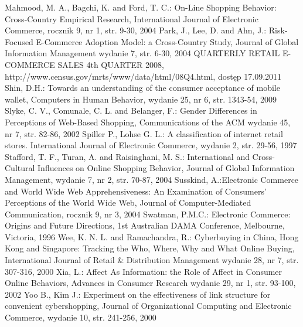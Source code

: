 {\begin{thebibliography}{5}
     Mahmood, M. A., Bagchi, K. and Ford, T. C.: On-Line Shopping Behavior: Cross-Country Empirical Research, International Journal of Electronic Commerce, rocznik 9, nr 1, str. 9-30, 2004
     Park, J., Lee, D. and Ahn, J.: Risk-Focused E-Commerce Adoption Model: a Cross-Country Study, Journal of Global Information Management wydanie 7, str. 6-30, 2004
     QUARTERLY RETAIL E-COMMERCE SALES 4th QUARTER 2008, http://www.census.gov/mrts/www/data/html/08Q4.html, dostęp 17.09.2011
     Shin, D.H.: Towards an understanding of the consumer acceptance of mobile wallet,
Computers in Human Behavior, wydanie 25, nr 6, str. 1343-54, 2009
     Slyke, C. V., Comunale, C. L. and Belanger, F.: Gender Differences in Perceptions of Web-Based Shopping, Communications of the ACM wydanie 45, nr 7, str. 82-86, 2002
     Spiller P., Lohse G. L.: A classification of internet retail stores. International Journal of Electronic Commerce, wydanie 2, str. 29-56, 1997
     Stafford, T. F., Turan, A. and Raisinghani, M. S.: International and Cross-Cultural Influences on Online Shopping Behavior, Journal of Global Information Management, wydanie 7, nr 2, str. 70-87, 2004
     Susskind, A.:Electronic Commerce and World Wide Web Apprehensiveness: An Examination of Consumers' Perceptions of the World Wide Web, Journal of Computer-Mediated Communication, rocznik 9, nr 3, 2004
     Swatman, P.M.C.: Electronic Commerce: Origins and Future Directions, 1st
Australian DAMA Conference, Melbourne, Victoria, 1996
     Wee, K. N. L. and Ramachandra, R.: Cyberbuying in China, Hong Kong and Singapore: Tracking the Who, Where, Why and What Online Buying, International Journal of Retail \& Distribution Management wydanie 28, nr 7, str. 307-316, 2000
     Xia, L.: Affect As Information: the Role of Affect in Consumer Online Behaviors, Advances in Consumer Research wydanie 29, nr 1, str. 93-100, 2002
     Yoo B., Kim J.: Experiment on the effectiveness of link structure for convenient cybershopping, Journal of Organizational Computing and Electronic Commerce, wydanie 10, str. 241-256, 2000

  \end{thebibliography}
  \newpage
}

